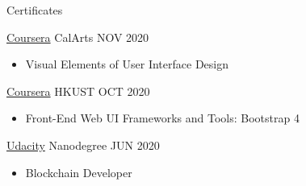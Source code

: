 \documentclass[]{mcdowellcv}
\begin{document}
	\begin{cvsection}{Certificates}
		\begin{cvsubsection}{\href{https://www.coursera.org/account/accomplishments/certificate/3QJ84H63TU2F}{Coursera}}
			{CalArts}
			{NOV 2020}
			\begin{itemize}
				\item Visual Elements of User Interface Design
			\end{itemize}
		\end{cvsubsection}
		
		\begin{cvsubsection}{\href{https://www.coursera.org/account/accomplishments/certificate/MMCVDWAMRN6N}{Coursera}}
			{HKUST}
			{OCT 2020}
			\begin{itemize}
				\item Front-End Web UI Frameworks and Tools: Bootstrap 4
			\end{itemize}
		\end{cvsubsection}
		\begin{cvsubsection}{\href{https://graduation.udacity.com/confirm/DTZZCCYZ}{Udacity}}
			{Nanodegree}
			{JUN 2020}
			\begin{itemize}
				\item Blockchain Developer
			\end{itemize}
		\end{cvsubsection}
		

\end{cvsection}
\end{document}
